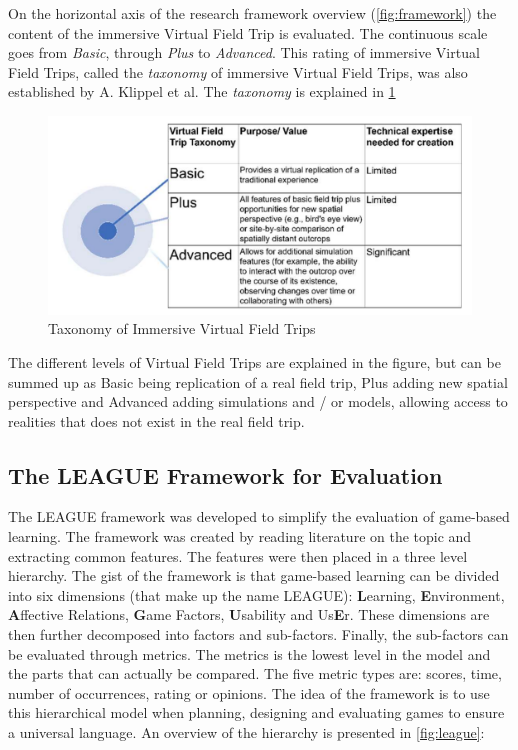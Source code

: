         On the horizontal axis of the research framework overview (\cref{fig:framework}) the content of the immersive Virtual Field Trip is evaluated. The continuous scale goes from \emph{Basic}, through \emph{Plus} to \emph{Advanced}. This rating of immersive Virtual Field Trips, called the \emph{taxonomy} of immersive Virtual Field Trips, was also established by A. Klippel et al. The \emph{taxonomy} is explained in \cref{fig:taxonomy}
        
        \FloatBarrier
        \begin{figure}[!ht]
            \centering
            \includegraphics[width=0.7\linewidth]{figures/framework_content_3.PNG}
            \caption{Taxonomy of Immersive Virtual Field Trips}
            \label{fig:taxonomy}
        \end{figure}
        \FloatBarrier
        
        The different levels of Virtual Field Trips are explained in the figure, but can be summed up as Basic being replication of a real field trip, Plus adding new spatial perspective and Advanced adding simulations and / or models, allowing access to realities that does not exist in the real field trip.
        
    \subsection{The LEAGUE Framework for Evaluation}
        \label{sec:league}
        The LEAGUE framework\cite{league} was developed to simplify the evaluation of game-based learning. The framework was created by reading literature on the topic and extracting common features. The features were then placed in a three level hierarchy. The gist of the framework is that game-based learning can be divided into six dimensions (that make up the name LEAGUE): \textbf{L}earning, \textbf{E}nvironment, \textbf{A}ffective Relations, \textbf{G}ame Factors, \textbf{U}sability and Us\textbf{E}r. These dimensions are then further decomposed into factors and sub-factors. Finally, the sub-factors can be evaluated through metrics. The metrics is the lowest level in the model and the parts that can actually be compared. The five metric types are: scores, time, number of occurrences, rating or opinions. The idea of the framework is to use this hierarchical model when planning, designing and evaluating games to ensure a universal language. An overview of the hierarchy is presented in \cref{fig:league}:
        
